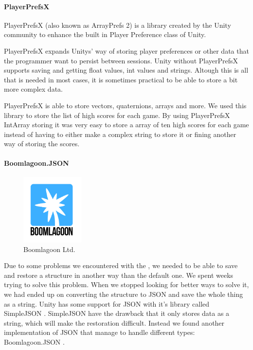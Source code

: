 \paragraph{PlayerPrefsX}
PlayerPrefsX (also known as ArrayPrefs 2)\cite{PlayerPrefsX} is a library created by the Unity community to enhance the built in Player Preference class of Unity.

PlayerPrefsX expands Unitys' way of storing player preferences or other data that the programmer want to persist between sessions.
Unity without PlayerPrefsX supports saving and getting float values, int values and strings. Altough this is all that is needed in most cases, it is sometimes practical to be able to store a bit more complex data.

PlayerPrefsX is able to store vectors, quaternions, arrays and more. 
We used this library to store the list of high scores for each game. 
By using PlayerPrefsX IntArray storing it was very easy to store a array of ten high scores for each game instead of having to either make a complex string to store it or fining another way of storing the scores.

\paragraph{Boomlagoon.{JSON}}

\begin{figure}
	\capstart
	\centering
	\vspace{-20pt}
	\includegraphics[width=0.28\textwidth]{images/Boomlagoon.png}
	\vspace{-20pt}
	\caption[Boomlagoon {L}td.]{Boomlagoon {L}td.}
	\label{fig:boomlagoon}
	\vspace{-10pt}
\end{figure}

Due to some problems we encountered with the ,
we needed to be able to save and restore a structure in another way than the
default one. We spent weeks trying to solve this problem. When we stopped
looking for better ways to solve it, we had ended up on converting the 
structure to {JSON} and save the whole thing as a string.
Unity has some support for {JSON} with it's library called Simple{JSON} 
\cite{SimpleJSON}. Simple{JSON} have the drawback that it only stores data
as a string, which will make the restoration difficult. Instead we found
another implementation of JSON that manage to handle different types:
Boomlagoon.{JSON} \cite{Boomlagoon.JSON}.

